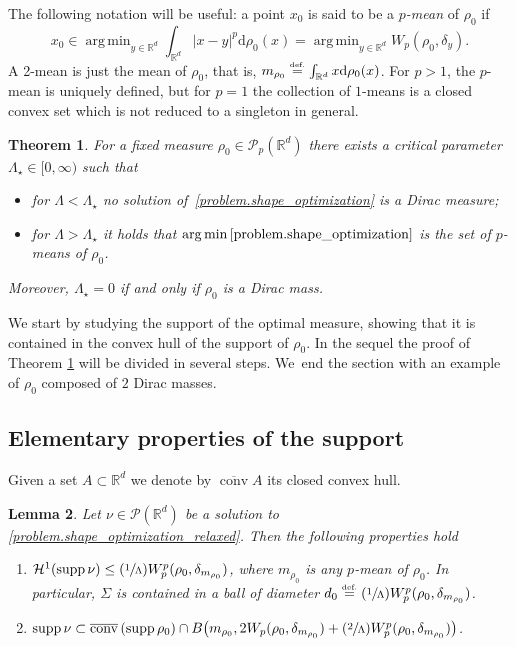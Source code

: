\documentclass[JEP,XML,SOM,Unicode,NoFloatCountersInSection,published]{cedram}
\newcommand{\Psfrac}[2]{(\sfrac{#1}{#2})}
\newtheorem{theorem}{Theorem}[section]
\newtheorem{lemma}[theorem]{Lemma}
\theoremstyle{definition}
\newcommand{\eqdef}{\ensuremath{\stackrel{\mbox{\upshape\tiny def.}}{=}}}
\newcommand\cH{\mathcal{H}}
\newcommand{\RR}{\mathbb{R}}
\DeclareMathOperator*{\argmin}{arg\,min}
\DeclareMathOperator{\supp}{supp}
\DeclareMathOperator{\conv}{conv}
\newcommand{\cconv}{\overline{\conv}}
\newcommand\dd{\mathrm{d}}
\begin{document}
The following notation will be useful: a point $x_0$ is said to be a \emph{$p$-mean} of $\rho_0$ if
\[
x_0 \in
\argmin_{y \in \RR^d} \int_{\RR^d}|x - y|^p\dd \rho_0(x)
=
\argmin_{y \in \RR^d} W_p(\rho_0, \delta_y).
\]
A 2-mean is just the mean of $\rho_0$, that is, $m_{\rho_0} \eqdef \int_{\RR^d}x \dd \rho_0(x)$. For $p>1$, the $p$-mean is uniquely defined, but for $p=1$ the collection of $1$-means is a closed convex set which is not reduced to a singleton in general.

\begin{theorem}\label{theorem.when_sols_are_diracs}
For a fixed measure $\rho_0 \in \mathcal{P}_p(\RR^d)$ there exists a critical parameter $\Lambda_\star \in [0, \infty)$ such that
\begin{itemize}
\item for $\Lambda < \Lambda_\star$ no solution of~\eqref{problem.shape_optimization}
is a Dirac measure;
\item for $\Lambda > \Lambda_\star$ it holds that
$\argmin\eqref{problem.shape_optimization}$
is the set of $p$-means of $\rho_0$.
\end{itemize}
Moreover, $\Lambda_\star=0$ if and only if $\rho_0$ is a Dirac mass.
\end{theorem}

We start by studying the support of the optimal measure, showing that it is contained in the convex hull of the support of $\rho_0$. In the sequel the proof of Theorem \ref{theorem.when_sols_are_diracs} will be divided in several steps. We~end the section with an example of $\rho_0$ composed of $2$ Dirac masses.

\subsection{Elementary properties of the support}
Given a set $A \subset \RR^d$ we denote by $\cconv A$ its closed convex hull.
\begin{lemma}\label{lem.convexhull}
Let $\nu \in\mathcal{P}(\RR^d)$ be a solution to \eqref{problem.shape_optimization_relaxed}. Then the following properties hold
\begin{enumerate}
\item
$\cH^1(\supp \nu)\leq \Psfrac{1}{\Lambda}W^p_p(\rho_0,\delta_{m_{\rho_0}})$, where $m_{\rho_0}$ is any $p$-mean of $\rho_0$. In particular, $\Sigma$ is contained in a ball of diameter $d_0\eqdef \Psfrac{1}{\Lambda}W^p_p(\rho_0,\delta_{m_{\rho_0}})$.
\item
$\supp \nu \subset \cconv\left(\supp \rho_0\right)
\cap B\big({m_{\rho_0}},2W_p(\rho_0,\delta_{m_{\rho_0}})
+ \Psfrac{2}{\Lambda}W_p^p(\rho_0,\delta_{m_{\rho_0}})\big)$.
\end{enumerate}
\end{lemma}
\end{document}
